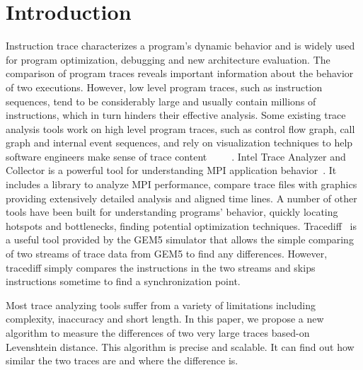 \documentclass[10pt,journal,cspaper,compsoc]{IEEEtran}
\begin{document}
%
\IEEEpeerreviewmaketitle



\section{Introduction}
Instruction trace characterizes a program's dynamic behavior and is
widely used for program optimization, debugging and new architecture
evaluation. The comparison of program traces reveals important
information about the behavior of two executions. However, low level
program traces, such as instruction sequences, tend to be
considerably large and usually contain millions of instructions,
which in turn hinders their effective analysis. Some existing trace
analysis tools work on high level program traces, such as control
flow graph, call graph and internal event sequences, and rely on
visualization techniques to help software engineers make sense of
trace
content~\cite{trace11}~\cite{trace05}~\cite{trace99}~\cite{trace06}~\cite{trace052}.
Intel Trace Analyzer and Collector is a powerful tool for
understanding MPI application behavior~\cite{traceintel}. It
includes a library to analyze MPI performance, compare trace files
with graphics providing extensively detailed analysis and aligned
time lines. A number of other tools have been built for
understanding programs' behavior, quickly locating hotspots and
bottlenecks, finding potential optimization techniques.
Tracediff~\cite{tracediff} is a useful tool provided by the GEM5
simulator that allows the simple comparing of two streams of trace
data from GEM5 to find any differences. However, tracediff simply
compares the instructions in the two streams and skips instructions
sometime to find a synchronization point.

Most trace analyzing tools suffer from a variety of limitations
including complexity, inaccuracy and short length. In this paper, we
propose a new algorithm to measure the differences of two very large
traces based-on Levenshtein distance. This algorithm is precise and
scalable. It can find out how similar the two traces are and where
the difference is.
\end{document}
